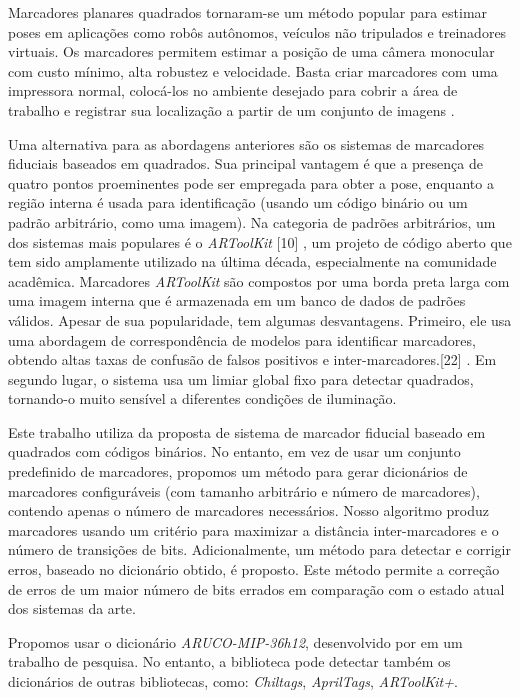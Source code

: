 Marcadores planares quadrados tornaram-se um método popular para estimar poses em aplicações como robôs autônomos, veículos não tripulados e treinadores virtuais. Os marcadores permitem estimar a posição de uma câmera monocular com custo mínimo, alta robustez e velocidade. Basta criar marcadores com uma impressora normal, colocá-los no ambiente desejado para cobrir a área de trabalho e registrar sua localização a partir de um conjunto de imagens \cite{Ramirez2018}.

Uma alternativa para as abordagens anteriores são os sistemas de marcadores fiduciais baseados em quadrados. Sua principal vantagem é que a presença de quatro pontos proeminentes pode ser empregada para obter a pose, enquanto a região interna é usada para identificação (usando um código binário ou um padrão arbitrário, como uma imagem). Na categoria de padrões arbitrários, um dos sistemas mais populares é o \textit{ARToolKit} [10] , um projeto de código aberto que tem sido amplamente utilizado na última década, especialmente na comunidade acadêmica. Marcadores \textit{ARToolKit} são compostos por uma borda preta larga com uma imagem interna que é armazenada em um banco de dados de padrões válidos. Apesar de sua popularidade, tem algumas desvantagens. Primeiro, ele usa uma abordagem de correspondência de modelos para identificar marcadores, obtendo altas taxas de confusão de falsos positivos e inter-marcadores.[22] . Em segundo lugar, o sistema usa um limiar global fixo para detectar quadrados, tornando-o muito sensível a diferentes condições de iluminação.


Este trabalho utiliza da proposta de sistema de marcador fiducial baseado em quadrados com códigos binários. No entanto, em vez de usar um conjunto predefinido de marcadores, propomos um método para gerar dicionários de marcadores configuráveis ​​(com tamanho arbitrário e número de marcadores), contendo apenas o número de marcadores necessários. Nosso algoritmo produz marcadores usando um critério para maximizar a distância inter-marcadores e o número de transições de bits. Adicionalmente, um método para detectar e corrigir erros, baseado no dicionário obtido, é proposto. Este método permite a correção de erros de um maior número de bits errados em comparação com o estado atual dos sistemas da arte.


Propomos usar o dicionário \textit{ARUCO-MIP-36h12}, desenvolvido por \cite{Garrido2016} em um trabalho de pesquisa. No entanto, a biblioteca pode detectar também os dicionários de outras bibliotecas, como: \textit{Chiltags}, \textit{AprilTags}, \textit{ARToolKit+}.

